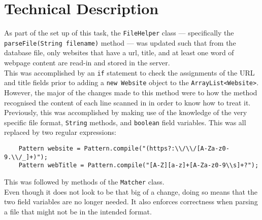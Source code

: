 \section{Technical Description}
As part of the set up of this task, the {\tt FileHelper} class — specifically the {\tt parseFile(String filename)} method — was updated such that from the database file, only websites that have a url, title, and at least one word of webpage content are read-in and stored in the server.\\
This was accomplished by an {\tt if} statement to check the assignments of the URL and title fields prior to adding a {\tt new Website} object to the {\tt ArrayList<Website>}. However, the major of the changes made to this method were to how the method recognised the content of each line scanned in in order to know how to treat it.\\
Previously, this was accomplished by making use of the knowledge of the very specific file format, {\tt String} methods, and {\tt boolean} field variables. This was all replaced by two regular expressions:
\begin{lstlisting}
    Pattern website = Pattern.compile("(https?:\\/\\/[A-Za-z0-9.\\/_]+)");
    Pattern webTitle = Pattern.compile("[A-Z][a-z]+[A-Za-z0-9\\s]+?");
\end{lstlisting}
This was followed by methods of the {\tt Matcher} class.\\
Even though it does not look to be that big of a change, doing so means that the two field variables are no longer needed. It also enforces correctness when parsing a file that might not be in the intended format.


